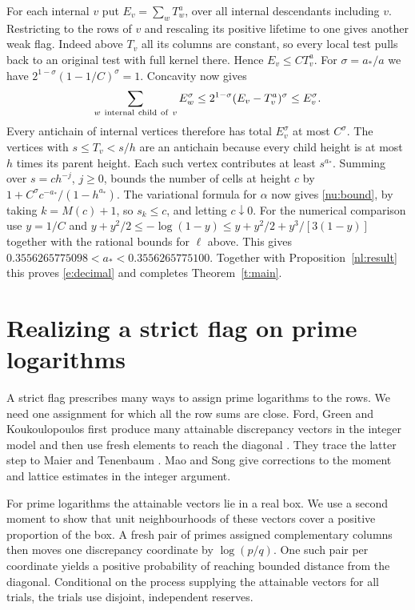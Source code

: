 \documentclass[11pt]{article}
\numberwithin{equation}{section}
\begin{document}
For each internal $v$ put $E_v=\sum_{w}T_w^a$, over all internal
descendants including $v$. Restricting to the rows of $v$ and
rescaling its positive lifetime to one gives another weak flag.
Indeed above $T_v$ all its columns are constant, so every local
test pulls back to an original test with full kernel there.
Hence $E_v\le C T_v^a$. For $\sigma=a_*/a$ we have
$2^{1-\sigma}(1-1/C)^\sigma=1$. Concavity now gives
\[
 \sum_{w\ {\rm internal\ child\ of}\ v} E_w^\sigma
 \le 2^{1-\sigma}(E_v-T_v^a)^\sigma\le E_v^\sigma.
\]
Every antichain of internal vertices therefore has total
$E_v^\sigma$ at most $C^\sigma$. The vertices with
$s\le T_v<s/h$ are an antichain because every child height is
at most $h$ times its parent height. Each such vertex contributes
at least $s^{a_*}$. Summing over $s=ch^{-j}$, $j\ge0$, bounds
the number of cells at height $c$ by
$1+C^\sigma c^{-a_*}/(1-h^{a_*})$. The variational formula for
$\alpha$ now gives \eqref{nu:bound}, by taking
$k=M(c)+1$, so $s_k\le c$, and letting $c\downarrow0$.
For the numerical comparison use $y=1/C$ and
$y+y^2/2\le-\log(1-y)\le y+y^2/2+y^3/[3(1-y)]$ together
with the rational bounds for $\ell$ above. This gives
$0.3556265775098<a_*<0.3556265775100$. Together with
Proposition~\ref{nl:result} this proves \eqref{e:decimal} and
completes Theorem~\ref{t:main}.

\appendix
\section{Realizing a strict flag on prime logarithms}
\label{s:realization}

A strict flag prescribes many ways to assign prime logarithms to
the rows. We need one assignment for which all the row sums are
close. Ford, Green and Koukoulopoulos first produce many attainable
discrepancy vectors in the integer model and then use fresh elements
to reach the diagonal \cite[Propositions~5.9, 6.4 and Lemma~6.5]{fgk}.
They trace the latter step to Maier and Tenenbaum \cite{mt84}.
Mao and Song \cite[Appendix~A]{ms} give corrections to the moment
and lattice estimates in the integer argument.

For prime logarithms the attainable vectors lie in a real box.
We use a second moment to show that unit neighbourhoods of these
vectors cover a positive proportion of the box. A fresh pair of
primes assigned complementary columns then moves one discrepancy
coordinate by $\log(p/q)$. One such pair per coordinate yields a
positive probability of reaching bounded distance from the
diagonal. Conditional on the process supplying the attainable
vectors for all trials, the trials use disjoint, independent
reserves.
\end{document}

